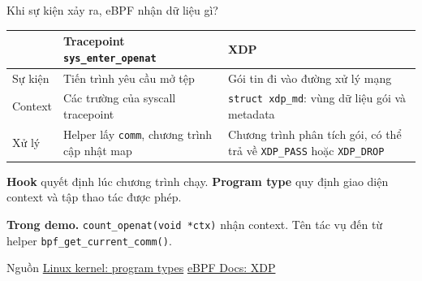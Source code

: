 \begin{frame}{Khi sự kiện xảy ra, eBPF nhận dữ liệu gì?}
  \small
  \renewcommand{\arraystretch}{1.35}
  \begin{tabular}{@{}L{0.16\textwidth}L{0.40\textwidth}L{0.36\textwidth}@{}}
    \toprule
            & \textbf{Tracepoint \texttt{sys\_enter\_openat}}     & \textbf{XDP}                                                                         \\
    \midrule
    Sự kiện & Tiến trình yêu cầu mở tệp                           & Gói tin đi vào đường xử lý mạng                                                      \\
    Context & Các trường của syscall tracepoint                   & \texttt{struct xdp\_md}: vùng dữ liệu gói và metadata                                \\
    Xử lý   & Helper lấy \texttt{comm}, chương trình cập nhật map & Chương trình phân tích gói, có thể trả về \texttt{XDP\_PASS} hoặc \texttt{XDP\_DROP} \\
    \bottomrule
  \end{tabular}
  \medskip

  \textbf{Hook} quyết định lúc chương trình chạy. \textbf{Program type} quy định giao diện context và tập thao tác được phép.

  \smallskip
  \textbf{Trong demo.} \texttt{count\_openat(void *ctx)} nhận context. Tên tác vụ đến từ helper \texttt{bpf\_get\_current\_comm()}.

  \smallskip
  {\scriptsize Nguồn \href{https://docs.kernel.org/bpf/libbpf/program_types.html}{Linux kernel: program types}
    \quad \href{https://docs.ebpf.io/linux/program-type/BPF_PROG_TYPE_XDP/}{eBPF Docs: XDP}}
\end{frame}

